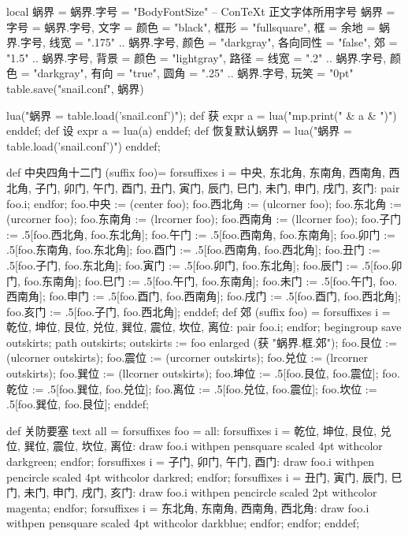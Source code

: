\startluacode
local 蜗界 = {}
蜗界.字号 = "BodyFontSize" -- ConTeXt 正文字体所用字号
蜗界 = {
    字号 = 蜗界.字号,
    文字 = {颜色 = "black"},
    框形 = "fullsquare",
    框 = {余地 = 蜗界.字号, 
          线宽 = ".175" .. 蜗界.字号, 
          颜色 = "darkgray",
          各向同性 = "false",
          郊 = "1.5" .. 蜗界.字号},
    背景 = {颜色 = "lightgray"},
    路径 = {线宽 = ".2" .. 蜗界.字号,
            颜色 = "darkgray",
            有向 = "true",
            圆角 = ".25" .. 蜗界.字号},
    玩笑 = "0pt"
}
table.save("snail.conf", 蜗界)
\stopluacode

\startMPinclusions
lua("蜗界 = table.load('snail.conf')");
def 获 expr a = lua("mp.print(" & a & ")") enddef;
def 设 expr a = lua(a) enddef;
def 恢复默认蜗界 =
  lua("蜗界 = table.load('snail.conf')")
enddef;
\stopMPinclusions

\startMPinclusions[+]
def 中央四角十二门 (suffix foo)= 
  forsuffixes i = 中央, 东北角, 东南角, 西南角, 西北角,
                  子门, 卯门, 午门, 酉门,
                  丑门, 寅门, 辰门, 巳门, 未门, 申门, 戌门, 亥门:
    pair foo.i;
  endfor;
  foo.中央 := (center foo);
  foo.西北角 := (ulcorner foo); 
  foo.东北角 := (urcorner foo);
  foo.东南角 := (lrcorner foo);
  foo.西南角 := (llcorner foo);
  foo.子门 := .5[foo.西北角, foo.东北角];
  foo.午门 := .5[foo.西南角, foo.东南角];
  foo.卯门 := .5[foo.东南角, foo.东北角];
  foo.酉门 := .5[foo.西南角, foo.西北角];
  foo.丑门 := .5[foo.子门, foo.东北角];
  foo.寅门 := .5[foo.卯门, foo.东北角];
  foo.辰门 := .5[foo.卯门, foo.东南角];
  foo.巳门 := .5[foo.午门, foo.东南角];
  foo.未门 := .5[foo.午门, foo.西南角];
  foo.申门 := .5[foo.酉门, foo.西南角];
  foo.戌门 := .5[foo.酉门, foo.西北角];
  foo.亥门 := .5[foo.子门, foo.西北角];
enddef;
def 郊 (suffix foo) = 
  forsuffixes i = 乾位, 坤位, 艮位, 兑位, 巽位, 震位, 坎位, 离位:
    pair foo.i;
  endfor;
  begingroup
    save outskirts; path outskirts;
  outskirts := foo enlarged (获 "蜗界.框.郊");
  foo.艮位 := (ulcorner outskirts); 
  foo.震位 := (urcorner outskirts);
  foo.兑位 := (lrcorner outskirts);
  foo.巽位 := (llcorner outskirts);
  foo.坤位 := .5[foo.艮位, foo.震位];
  foo.乾位 := .5[foo.巽位, foo.兑位];
  foo.离位 := .5[foo.兑位, foo.震位];
  foo.坎位 := .5[foo.巽位, foo.艮位];
enddef;

def 关防要塞 text all =
  forsuffixes foo = all:
    forsuffixes i = 乾位, 坤位, 艮位, 兑位, 巽位, 震位, 坎位, 离位:
      draw foo.i withpen pensquare scaled 4pt withcolor darkgreen;
    endfor;
    forsuffixes i = 子门, 卯门, 午门, 酉门:
      draw foo.i withpen pencircle scaled 4pt withcolor darkred;
    endfor;
    forsuffixes i = 丑门, 寅门, 辰门, 巳门, 未门, 申门, 戌门, 亥门:
      draw foo.i withpen pencircle scaled 2pt withcolor magenta;
    endfor;
    forsuffixes i = 东北角, 东南角, 西南角, 西北角:
      draw foo.i withpen pensquare scaled 4pt withcolor darkblue;
    endfor;
  endfor;
enddef;
\stopMPinclusions

